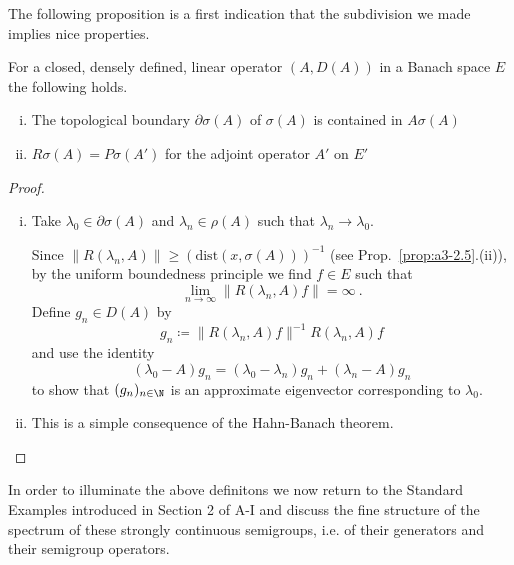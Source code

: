The following proposition is a first indication that the subdivision we made implies nice properties.
\begin{proposition}\label{prop:a3-2.2}
For a closed, densely defined, linear operator $(A,D(A))$ in a Banach space $E$ the following holds.
\begin{enumerate}[(i)]

\item
The topological boundary $\partial\sigma(A)$ of $\sigma(A)$ is contained in $A\sigma(A)$

\item
$R\sigma(A) = P\sigma(A')$ for the adjoint operator $A'$ on $E'$

\end{enumerate}
\end{proposition}
\begin{proof}
\begin{enumerate}[(i), wide]

\item 
Take $\lambda_{0} \in \partial\sigma(A)$ and $\lambda_{n} \in \rho(A)$ such that $\lambda_{n} \to \lambda_{0}$.

Since $\|R(\lambda_{n},A)\| \geq (\text{dist}(x,\sigma(A)))^{-1}$ (see Prop.~\ref{prop:a3-2.5}.(ii)), by the uniform boundedness principle we find $f \in E$ such that
\[
\lim_{n \to \infty}\|R(\lambda_n ,A)f\| = \infty~.
\]
Define $g_{n} \in D(A)$ by
\[
g_{n} \coloneqq \|R(\lambda_{n},A)f\|^{-1} R(\lambda_{n},A)f
\]
and use the identity
\[
(\lambda_{0} - A)g_{n} = (\lambda_{0} - \lambda_{n})g_{n} + (\lambda_{n} - A)g_{n}
\]
to show that $(g_{n})_{n \in \N}$ is an approximate eigenvector corresponding to $\lambda_{0}$.

\item 
This is a simple consequence of the Hahn-Banach theorem.
\end{enumerate}
\end{proof}

In order to illuminate the above definitons we now return to the Standard Examples introduced in Section 2 of A-I and discuss the fine structure of the spectrum of these strongly continuous semigroups, i.e. of their generators and their semigroup operators.


